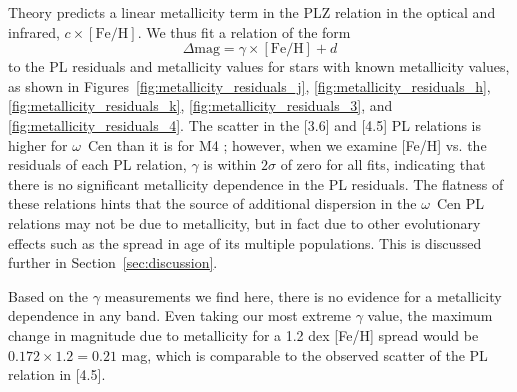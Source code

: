 \documentclass[a4paper,fleqn,usenatbib]{mnras}
\newcommand{\ocen}{$\omega$~Cen\xspace}
\begin{document}
Theory predicts a linear metallicity term in the PLZ relation in the optical and infrared, $c\times[\text{Fe/H}]$.
We thus fit a relation of the form
\begin{equation}
\label{eqn:delta_mag}
\Delta\text{mag} = \gamma \times[\text{Fe/H}] + d
\end{equation}
to the PL residuals and metallicity values for stars with known metallicity values, as shown in Figures~\ref{fig:metallicity_residuals_j}, \ref{fig:metallicity_residuals_h}, \ref{fig:metallicity_residuals_k}, \ref{fig:metallicity_residuals_3}, and \ref{fig:metallicity_residuals_4}. The scatter in the [3.6] and [4.5] PL relations is higher for \ocen than it is for M4 \citep{2015ApJ...808...11N, 2015ApJ...799..165B}; however, when we examine [Fe/H] vs. the residuals of each PL relation, $\gamma$ is within $2\sigma$ of zero for all fits, indicating that there is no significant metallicity dependence in the PL residuals. The flatness of these relations hints that the source of additional dispersion in the \ocen PL relations may not be due to metallicity, but in fact due to other evolutionary effects such as the spread in age of its multiple populations. This is discussed further in Section~\ref{sec:discussion}.

Based on the $\gamma$ measurements we find here, there is no evidence for a metallicity dependence in any band. Even taking our most extreme $\gamma$ value, the maximum change in magnitude due to metallicity for a 1.2 dex [Fe/H] spread would be $0.172 \times 1.2 = 0.21$ mag, which is comparable to the observed scatter of the PL relation in [4.5].

\end{document}
